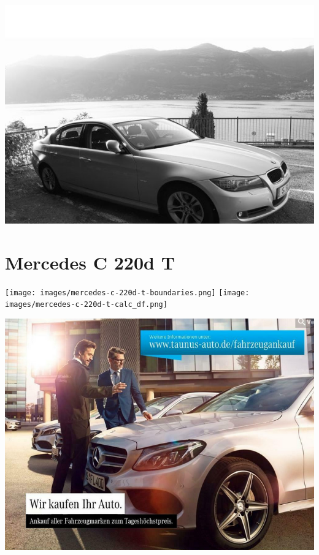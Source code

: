 \documentclass[landscape, DIV=99, 14pt]{scrartcl}
\begin{document}
\pagebreak
\null
\vspace{2cm}
\begin{center}
\includegraphics[width=0.9\columnwidth]{cars/bmw-3er-maximus.png}
\end{center}

\pagebreak


\twocolumn

\section*{Mercedes C 220d T}
\begin{center}
\texttt{[image: images/mercedes-c-220d-t-boundaries.png]}
\null
\vspace{0.5cm}
\texttt{[image: images/mercedes-c-220d-t-calc\_df.png]}
\end{center}

\pagebreak
\null
\vspace{2cm}
\begin{center}
\includegraphics[width=0.9\columnwidth]{cars/mercedes-c-220d-t.png}
\end{center}
\end{document}
